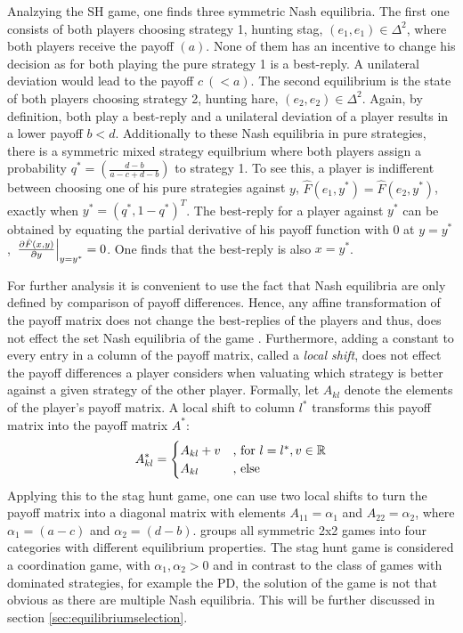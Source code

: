 Analzying the SH game, one finds three symmetric Nash equilibria.
The first one consists of both players choosing strategy 1, 
hunting stag, $(e_1,e_1) \in
\Delta^2$, where both players receive the payoff $(a)$. 
None of them has an incentive to change his decision as for both
playing the pure strategy 1 is a best-reply. A unilateral deviation would 
lead to the payoff $c\ (< a)$.
The second equilibrium is the state of 
both players choosing strategy 2, hunting hare, $(e_2,e_2)
\in \Delta^2$. Again, by definition, both play a best-reply and a unilateral 
deviation of a player results in a lower payoff $b<d$.
Additionally to these Nash equilibria in pure strategies, there is a symmetric
mixed strategy equilbrium where both players assign a probability 
$q^*=\left(\frac{d-b}{a-c+d-b}\right)$ to strategy 1. 
To see this, a player is indifferent between choosing one of his pure
strategies against $y$, $\hat{F}(e_1,y^*) = \hat{F}(e_2,y^*)$, exactly
when $y^*=(q^*,1-q^*)^T$. The best-reply for a player against $y^*$ can 
be obtained by equating the partial derivative of his payoff function 
with 0 at $y=y^*$, 
$\eval{\frac{\partial \hat{F}(x,y)}{\partial y}}_{y=y^*} = 0$.
One finds that the best-reply is also $x=y^*$. 

For further analysis it is convenient to use the fact that Nash equilibria 
are only defined by comparison of payoff differences. 
Hence, any affine transformation of the payoff matrix does not change the 
best-replies of the players and thus, does not effect the set Nash equilibria 
of the game \parencite[17-19]{weibull_evolutionary_1997}. 
Furthermore, adding a constant to every entry in a 
column of the payoff matrix, 
called a \textit{local shift}, does not effect the payoff differences
a player considers when valuating which strategy is better against a given
strategy of the other player.
Formally, let $A_{kl}$ denote the elements of the player's payoff matrix. 
A local shift to column $l^*$ transforms this payoff matrix into the payoff 
matrix $A^*$:
\begin{align*}
        A^*_{kl} =
        \begin{cases}
                A_{kl} + v & \text{,\ for}\ l=l^*, v \in \mathbb{R} \\
                A_{kl} & \text{,\ else}
        \end{cases}
\end{align*}
Applying this to the stag hunt game, one can use two local shifts to turn 
the payoff matrix into a diagonal matrix with elements $A_{11}=\alpha_1$ 
and $A_{22}=\alpha_2$, where $\alpha_1=(a-c)$ and $\alpha_2=(d-b)$. 
\textcite[28]{weibull_evolutionary_1997} groups all symmetric 2x2 games into 
four categories with different equilibrium properties. 
The stag hunt game is considered a coordination 
game, with $\alpha_1, \alpha_2 > 0$ and in contrast to the class of games
with dominated strategies, for example the PD, the solution of the game
is not that obvious as there are multiple Nash equilibria.
This will be further discussed in section \ref{sec:equilibriumselection}.

